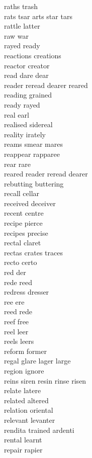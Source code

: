 raths trash\\
rats tsar arts star tars\\
rattle latter\\
raw war\\
rayed ready\\
reactions creations\\
reactor creator\\
read dare dear\\
reader reread dearer reared\\
reading grained\\
ready rayed\\
real earl\\
realised sidereal\\
reality irately\\
reams smear mares\\
reappear rapparee\\
rear rare\\
reared reader reread dearer\\
rebutting buttering\\
recall cellar\\
received deceiver\\
recent centre\\
recipe pierce\\
recipes precise\\
rectal claret\\
rectas crates traces\\
recto certo\\
red der\\
rede reed\\
redress dresser\\
ree ere\\
reed rede\\
reef free\\
reel leer\\
reels leers\\
reform former\\
regal glare lager large\\
region ignore\\
reins siren resin rinse risen\\
relate latere\\
related altered\\
relation oriental\\
relevant levanter\\
rendita trained ardenti\\
rental learnt\\
repair rapier\\
